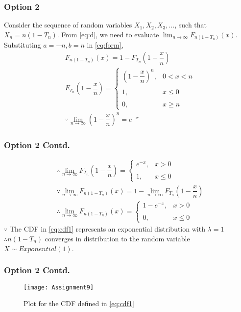 \documentclass{beamer}
\providecommand{\brak}[1]{\ensuremath{\left(#1\right)}}
\begin{document}
\begin{frame}
\frametitle{Option 2}
Consider the sequence of random variables $X_{1},X_{2},X_{3},\dots$, such that $X_{n}=n(1-T_{n})$. From \eqref{eq:d}, we need to evaluate $\displaystyle\lim_{n\to\infty}F_{n(1-T_{n})}(x)$. Substituting $a=-n,b=n$ in \eqref{eq:form},
\begin{align}
    &F_{n(1-T_{n})}(x)=1-F_{T_{n}}\brak{1-\dfrac{x}{n}}\\
    &F_{T_{n}}\brak{1-\dfrac{x}{n}}=\begin{cases}
	\brak{1-\dfrac{x}{n}}^{n}, & 0< x<n \\~\\[-1em]
	1, & x\leq 0\\~\\[-1em]
	0, & x\geq n
	\end{cases} \\
    &\because\displaystyle\lim_{n\to\infty}\brak{1-\dfrac{x}{n}}^{n}=e^{-x}
\end{align}
\end{frame}

\begin{frame}
\frametitle{Option 2 Contd.}
\begin{align}
&\therefore\displaystyle\lim_{n\to\infty} F_{T_{n}}\brak{1-\dfrac{x}{n}}=\begin{cases}
	e^{-x}, & x>0 \\~\\[-1em]
	1, & x\leq 0
	\end{cases} \\
&\because\displaystyle\lim_{n\to\infty}F_{n(1-T_{n})}(x)=1-\displaystyle\lim_{n\to\infty} F_{T_{n}}\brak{1-\dfrac{x}{n}}\\
\label{eq:cdf1}
    &\therefore\displaystyle\lim_{n\to\infty} F_{n(1-T_{n})}(x)=\begin{cases}
	1-e^{-x}, & x>0 \\~\\[-1em]
	0, & x\leq 0
	\end{cases} 
\end{align}
$\because$ The CDF in \eqref{eq:cdf1} represents an exponential distribution with $\lambda=1$\\
$\therefore n(1-T_{n})$ converges in distribution to the random variable $X\sim Exponential(1)$.
\end{frame}

\begin{frame}
\frametitle{Option 2 Contd.}
\begin{figure}[h!]
\centering
\texttt{[image: Assignment9]}
\caption{Plot for the CDF defined in \eqref{eq:cdf1}  }
\label{plot}
\end{figure}
\end{frame}
\end{document}
